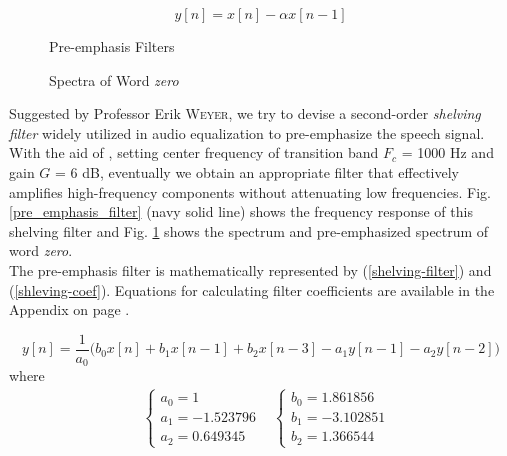 \begin{equation}
\label{high-pass-filter}
y[n] = x[n] - \alpha x[n-1]
\end{equation}

\begin{figure}[H]
\begin{minipage}[t]{0.5\linewidth}
\centering
{}
\caption{Pre-emphasis Filters}
\label{pre_emphasis_filter}
\end{minipage}
\begin{minipage}[t]{0.5\linewidth}
\centering
{}
\caption{Spectra of Word \textit{zero}}
\label{zero_fft}
\end{minipage}
\end{figure}

Suggested by Professor Erik \textsc{Weyer}, we try to devise a second-order \textit{shelving filter} widely utilized in audio equalization to pre-emphasize the speech signal. With the aid of \cite{DAFX_book}, setting center frequency of transition band $F_c$ = 1000 Hz and gain $G$ = 6 dB, eventually we obtain an appropriate filter that effectively amplifies high-frequency components without attenuating low frequencies. Fig. \ref{pre_emphasis_filter} (\textcolor{navy_matlab}{navy solid line}) shows the frequency response of this shelving filter and Fig. \ref{zero_fft} shows the spectrum and pre-emphasized spectrum of word \textit{zero}.\\

The pre-emphasis filter is mathematically represented by (\ref{shelving-filter}) and (\ref{shleving-coef}). Equations for calculating filter coefficients are available in the Appendix on page \pageref{shelving-appendix}.

\begin{equation}
\label{shelving-filter}
y[n] = \frac{1}{a_0} \Big( b_0 x[n] + b_1 x[n-1] + b_2 x[n-3] - a_1 y[n-1] - a_2 y[n-2] \Big)
\end{equation}
where
\begin{align}
\label{shleving-coef}
&\begin{cases}
a_0 = 1\\
a_1 = -1.523796\\
a_2 = 0.649345
\end{cases}
&\begin{cases}
b_0 = 1.861856\\
b_1 = -3.102851\\
b_2 = 1.366544
\end{cases}
\end{align}

